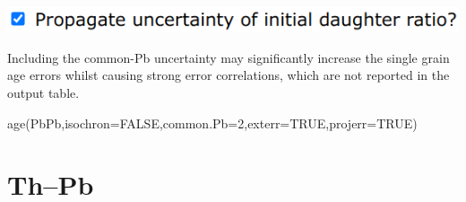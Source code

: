 \begin{refsection}
\begin{enumerate}
\noindent\begin{minipage}[t]{.5\linewidth}
\strut\vspace*{-\baselineskip}\newline
\includegraphics[width=\linewidth]{../figures/projerr.png}
\end{minipage}
\begin{minipage}[t]{.5\linewidth}
  Including the common-Pb uncertainty may significantly increase the
  single grain age errors whilst causing strong error correlations,
  which are not reported in the output table.
\end{minipage}

\begin{console}
age(PbPb,isochron=FALSE,common.Pb=2,exterr=TRUE,projerr=TRUE)
\end{console}

\end{enumerate}

\section{Th--Pb}\label{sec:ThPb-R}


\end{refsection}
